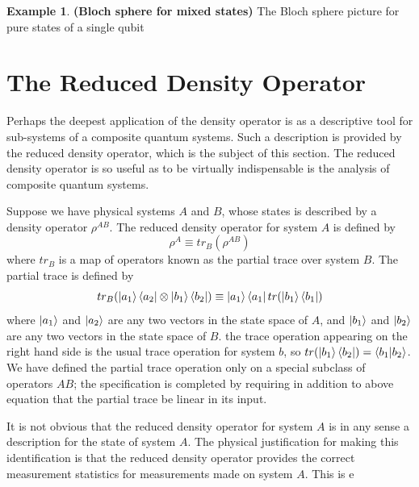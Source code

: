 \documentclass[12pt, oneside]{book}
\theoremstyle{definition}
\theoremstyle{definition}
\newtheorem{example}{Example}[section]
\theoremstyle{remark}
\begin{document}
\begin{example}
    \textbf{(Bloch sphere for mixed states)} The Bloch sphere picture for pure states of a single qubit
\end{example}

\section{The Reduced Density Operator}
Perhaps the deepest application of the density operator is as a descriptive tool for sub-systems of a composite quantum systems. Such a description is provided by the reduced density operator, which is the subject of this section. The reduced density operator is so useful as to be virtually indispensable is the analysis of composite quantum systems.

Suppose we have physical systems $A$ and $B$, whose states is described by a density operator $\rho^{AB}$. The reduced density operator for system $A$ is defined by 
\[
\rho^A \equiv tr_B(\rho^{AB})
\]
where $tr_B$ is a map of operators known as the partial trace over system $B$. The partial trace is defined by
\[
tr_B(\ket{a_1}\bra{a_2}\otimes \ket{b_1}\bra{b_2})\equiv \ket{a_1}\bra{a_1}tr(\ket{b_1}\bra{b_1})
\]
where $\ket{a_1}$ and $\ket{a_2}$ are any two vectors in the state space of $A$, and $\ket{b_1}$ and $\ket{b_2}$ are any two vectors in the state space of $B$. the trace operation appearing on the right hand side is the usual trace operation for system $b$, so $tr(\ket{b_1}\bra{b_2})=\braket{b_1|b_2}$. We have defined the partial trace operation only on a special subclass of operators $AB$; the specification is completed by requiring in addition to above equation that the partial trace be linear in its input.

It is not obvious that the reduced density operator for system $A$ is in any sense a description for the state of system $A$. The physical justification for making this identification is that the reduced density operator provides the correct measurement statistics for measurements made on system $A$. This is e
\end{document}
